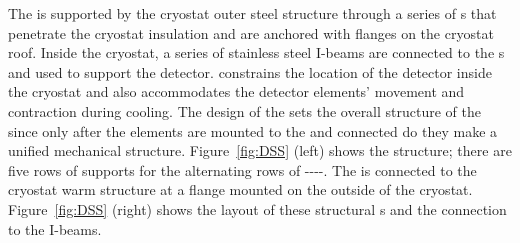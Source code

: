 The  is supported by the
cryostat outer steel structure through a series of \fdth{}s that penetrate %
the cryostat insulation and are anchored with flanges on
the cryostat roof. 
Inside the cryostat, a series of stainless steel I-beams are connected to the \fdth{}s and used to support the
detector. 
 constrains the location of the detector inside the cryostat and also accommodates the detector elements' movement and contraction  %
during cooling. 
The design of the  %
sets the overall
structure %
of the  since %
only after the elements are mounted to the  and connected do they make a unified mechanical structure. 
Figure~\ref{fig:DSS} (left) shows the  structure; there are
five rows of supports for the alternating rows of
----.  
The  is connected to the cryostat warm structure at a flange mounted on the outside of the cryostat.  
Figure~\ref{fig:DSS} (right)
shows the layout of these structural \fdth{}s and the connection to the I-beams.

